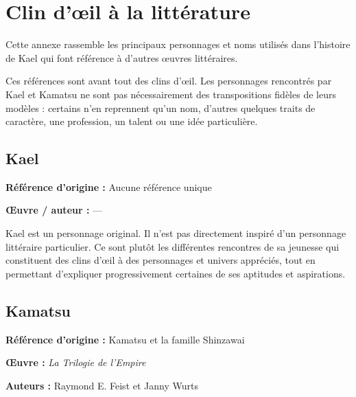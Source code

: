 
\chapter*{Clin d'œil à la littérature}

Cette annexe rassemble les principaux personnages et noms utilisés dans
l'histoire de Kael qui font référence à d'autres œuvres littéraires.

Ces références sont avant tout des clins d'œil. Les personnages rencontrés
par Kael et Kamatsu ne sont pas nécessairement des transpositions fidèles de
leurs modèles : certains n'en reprennent qu'un nom, d'autres quelques traits
de caractère, une profession, un talent ou une idée particulière.

\section*{Kael}

\textbf{Référence d'origine :} Aucune référence unique

\textbf{Œuvre / auteur :} ---

Kael est un personnage original. Il n'est pas directement inspiré d'un
personnage littéraire particulier. Ce sont plutôt les différentes rencontres
de sa jeunesse qui constituent des clins d'œil à des personnages et univers
appréciés, tout en permettant d'expliquer progressivement certaines de ses
aptitudes et aspirations.

\section*{Kamatsu}

\textbf{Référence d'origine :} Kamatsu et la famille Shinzawai

\textbf{Œuvre :} \textit{La Trilogie de l'Empire}

\textbf{Auteurs :} Raymond E. Feist et Janny Wurts

